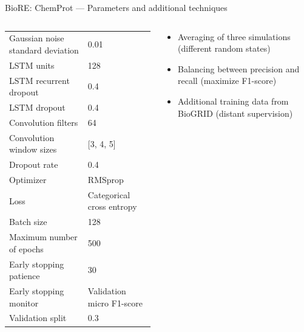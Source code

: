\begin{frame}[t]{BioRE: ChemProt --- Parameters and additional techniques}


\vspace*{-2mm}

\begin{columns}[t,totalwidth=\textwidth]


\begin{column}{0.50\textwidth}

\tiny
\renewcommand*{\arraystretch}{1.1}
\begin{tabular}{l@{\hskip4mm}l}
\toprule
Gaussian noise standard deviation & 0.01\\
LSTM units & 128\\
LSTM recurrent dropout & 0.4\\
LSTM dropout & 0.4\\
Convolution filters & 64\\
Convolution window sizes & [3, 4, 5]\\
Dropout rate & 0.4\\
\midrule
Optimizer & RMSprop\\
Loss & Categorical cross entropy\\
\midrule
Batch size & 128\\
Maximum number of epochs & 500\\
Early stopping patience & 30\\
Early stopping monitor & Validation micro F1-score\\
Validation split & 0.3\\
\bottomrule
\end{tabular}

\end{column}


\begin{column}{0.50\textwidth}

\vspace*{-2mm}

\fontsize{10.25pt}{12.30pt}\selectfont
\begin{itemize}
\setlength{\itemsep}{20.0pt}
\item Averaging of three simulations (different random states)
\item Balancing between precision and recall (maximize F1-score)
\item Additional training data from BioGRID (distant supervision)
\end{itemize}

\end{column}

\end{columns}

\end{frame}
